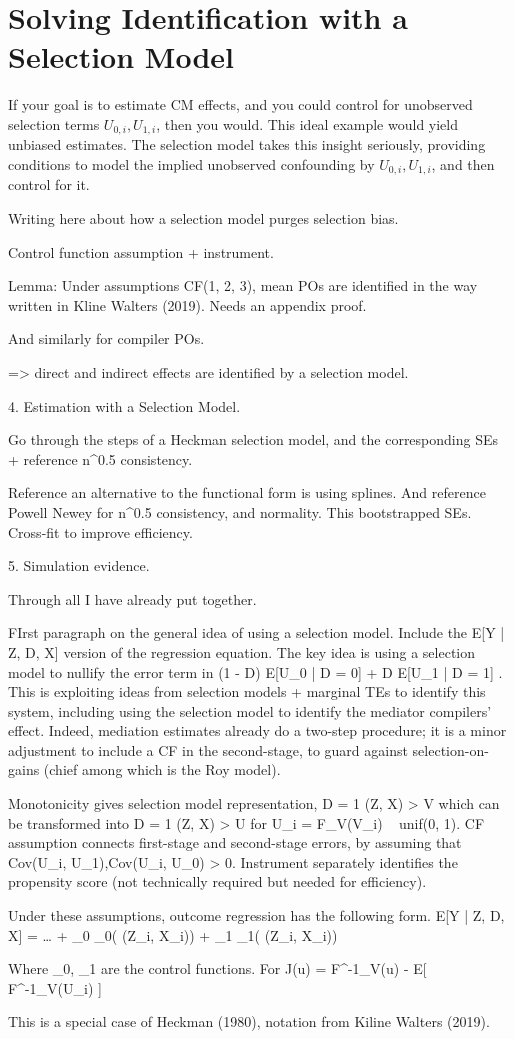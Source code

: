 \section{Solving Identification with a Selection Model}
\label{sec:selectionmodel}
If your goal is to estimate CM effects, and you could control for unobserved selection terms $U_{0,i}, U_{1,i}$, then you would.
This ideal example would yield unbiased estimates.
The selection model takes this insight seriously, providing conditions to model the implied unobserved confounding by $U_{0,i}, U_{1,i}$, and then control for it.

Writing here about how a \cite{heckman1974shadow} selection model purges selection bias.



Control function assumption + instrument.

Lemma: Under assumptions CF(1, 2, 3), mean POs are identified in the way written in Kline Walters (2019).
Needs an appendix proof.

And similarly for compiler POs.

=> direct and indirect effects are identified by a selection model.

4. Estimation with a Selection Model.

Go through the steps of a Heckman selection model,  and the corresponding SEs + reference n^0.5 consistency.

Reference an alternative to the functional form is using splines.  And reference Powell Newey for n^0.5 consistency, and normality.  This bootstrapped SEs.  Cross-fit to improve efficiency.

5. Simulation evidence.

Through all I have already put together.

FIrst paragraph on the general idea of using a selection model.  Include the E[Y | Z, D, X] version of the regression equation.
The key idea is using a selection model to nullify the error term in (1 - D) E[U_0 | D = 0] + D E[U_1 | D = 1] .  This is exploiting ideas from selection models + marginal TEs to identify this system, including using the selection model to identify the mediator compilers’ effect.  Indeed, mediation estimates already do a two-step procedure; it is a minor adjustment to include a CF  in the second-stage, to guard against selection-on-gains (chief among which is the Roy model).

Monotonicity gives selection model representation, D = 1{ \phi(Z, X) > V } which can be transformed into D = 1{ \pi(Z, X) > U } for U_i = F_V(V_i) ~ unif(0, 1).
CF assumption connects first-stage and second-stage errors, by assuming that Cov(U_i, U_1),Cov(U_i, U_0)  > 0.
Instrument separately identifies the propensity score (not technically required but needed for efficiency).

Under these assumptions, outcome regression has the following form.
E[Y | Z, D, X] = … + \rho_0 \lamda_0( \pi(Z_i, X_i)) + \rho_1 \lamda_1( \pi(Z_i, X_i))

Where \lambda_0, \lambda_1 are the control functions. For J(u) = F^-1_V(u) - E[ F^-1_V(U_i) ]

This is a special case of Heckman (1980), notation from Kiline Walters (2019).
